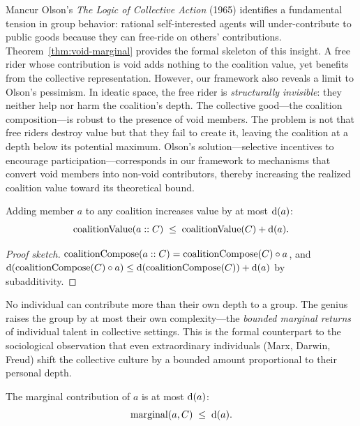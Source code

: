\begin{remark}
\label{rem:olson}
Mancur Olson's \textit{The Logic of Collective Action} (1965) identifies
a fundamental tension in group behavior: rational self-interested agents
will under-contribute to public goods because they can free-ride on
others' contributions.  Theorem~\ref{thm:void-marginal} provides the
formal skeleton of this insight.  A free rider whose contribution is void
adds nothing to the coalition value, yet benefits from the collective
representation.  However, our framework also reveals a limit to Olson's
pessimism.  In ideatic space, the free rider is \emph{structurally
invisible}: they neither help nor harm the coalition's depth.  The
collective good---the coalition composition---is robust to the presence
of void members.  The problem is not that free riders destroy value but
that they fail to create it, leaving the coalition at a depth below its
potential maximum.  Olson's solution---selective incentives to encourage
participation---corresponds in our framework to mechanisms that convert
void members into non-void contributors, thereby increasing the realized
coalition value toward its theoretical bound.
\end{remark}

\begin{theorem}
\label{thm:marginal-bounded}
Adding member $a$ to any coalition increases value by at most $\operatorname{d}(a)$:
\[
  \operatorname{coalitionValue}(a :: C) \;\le\;
  \operatorname{coalitionValue}(C) + \operatorname{d}(a).
\]
\end{theorem}

\begin{proof}[Proof sketch]
$\operatorname{coalitionCompose}(a :: C) =
\operatorname{coalitionCompose}(C) \circ a$, and
$\operatorname{d}(\operatorname{coalitionCompose}(C) \circ a)
\le \operatorname{d}(\operatorname{coalitionCompose}(C)) + \operatorname{d}(a)$
by subadditivity.
\end{proof}

No individual can contribute more than their own depth to a group.  The
genius raises the group by at most their own complexity---the \emph{bounded
marginal returns} of individual talent in collective settings.  This is the
formal counterpart to the sociological observation that even extraordinary
individuals (Marx, Darwin, Freud) shift the collective culture by a
bounded amount proportional to their personal depth.

\begin{theorem}
\label{thm:marginal-le-depth}
The marginal contribution of $a$ is at most $\operatorname{d}(a)$:
\[
  \operatorname{marginal}(a, C) \;\le\; \operatorname{d}(a).
\]
\end{theorem}


